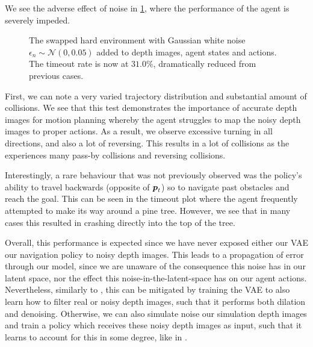 We see the adverse effect of noise in \cref{fig:hard_swapped_random_depth}, where the performance of the agent is severely impeded.
\begin{figure}[htb]
    \centering
    \caption{The swapped hard environment with Gaussian white noise $\epsilon_n \sim \mathcal{N}(0, 0.05)$ added to depth images, agent states and actions. The timeout rate is now at $31.0\%$, dramatically reduced from previous cases.}
    \label{fig:hard_swapped_random_depth}
\end{figure}
First, we can note a very varied trajectory distribution and substantial amount of collisions. We see that this test demonstrates the importance of accurate depth images for motion planning whereby the agent struggles to map the noisy depth images to proper actions. As a result, we observe excessive turning in all directions, and also a lot of reversing. 
This results in a lot of collisions as the experiences many pass-by collisions and reversing collisions.

Interestingly, a rare behaviour that was not previously observed was the policy's ability to travel backwards (opposite of ${\boldsymbol{p}}_t$) so to navigate past obstacles and reach the goal. This can be seen in the timeout plot where the agent frequently attempted to make its way around a pine tree. However, we see that in many cases this resulted in crashing directly into the top of the tree.

Overall, this performance is expected since we have never exposed either our VAE our navigation policy to noisy depth images. This leads to a propagation of error through our model, since we are unaware of the consequence this noise has in our latent space, nor the effect this noise-in-the-latent-space has on our agent actions. Nevertheless, similarly to \cite{LearningStateRepresentation}, this can be mitigated by training the VAE to also learn how to filter real or noisy depth images, such that it performs both dilation and denoising. Otherwise, we can also simulate noise our simulation depth images and train a policy which receives these noisy depth images as input, such that it learns to account for this in some degree, like in \cite{HighSpeedFlightWild}.



